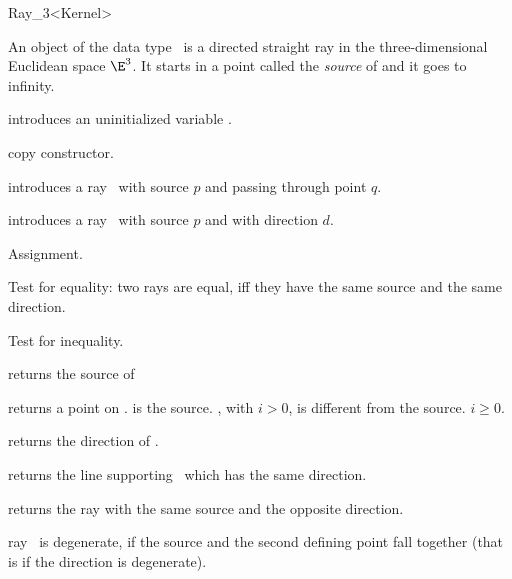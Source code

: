 \begin{ccRefClass} {Ray_3<Kernel>}

\ccDefinition
An object  of the data type \ccRefName\ is a directed
straight ray in the three-dimensional Euclidean space $\E^3$. It starts
in a  point called the {\em source} of   and it goes to infinity.


\ccCreation
{}


\ccHidden {}
             {introduces an uninitialized variable \ccVar.}

\ccHidden {}
 	    {copy constructor.}

            {introduces a ray \ccVar\ 
             with source $p$ and passing through point $q$.}

            {introduces a ray \ccVar\ with source $p$ and with 
             direction $d$.}

\ccOperations

\ccHidden {}
        {Assignment.}

       {Test for equality: two rays are equal, iff they have the same 
        source and the same direction.}

       {Test for inequality.}



       {returns the source of \ccVar}

       {returns a point on \ccVar.  is the source.
        \ccStyle{point(i)}, with $i>0$, is different from the 
        source. \ccPrecond $i \geq 0$.}

       {returns the direction of \ccVar.}

       {returns the line supporting \ccVar\ which has the same direction.}

       {returns the ray with the same source and the opposite direction.}

       {ray \ccVar\ is degenerate, if the source and the second defining
        point fall together (that is if the direction is degenerate).}



\end{ccRefClass}
